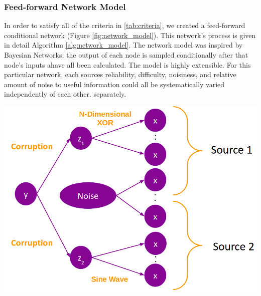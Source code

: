\documentclass{article}
\begin{document}
\subsubsection*{Feed-forward Network Model}

In order to satisfy all of the criteria in \ref{tab:criteria}, we created a
feed-forward conditional network (Figure \ref{fig:network_model}). This
network's process is given in detail Algorithm \ref{alg:network_model}. The
network model was inspired by Bayesian Networks; the output of each node is
sampled conditionally after that node's inputs ahave all been calculated. The
model is highly extensible. For this particular network, each sources
reliability, difficulty, noisiness, and relative amount of noise to useful
information could all be systematically varied independently of each other.
separately.

\begin{minipage}{\textwidth}
    \centering
    \includegraphics[scale=0.4]{network_model.png}
    \label{fig:network_model}
\end{minipage}
\end{document}

